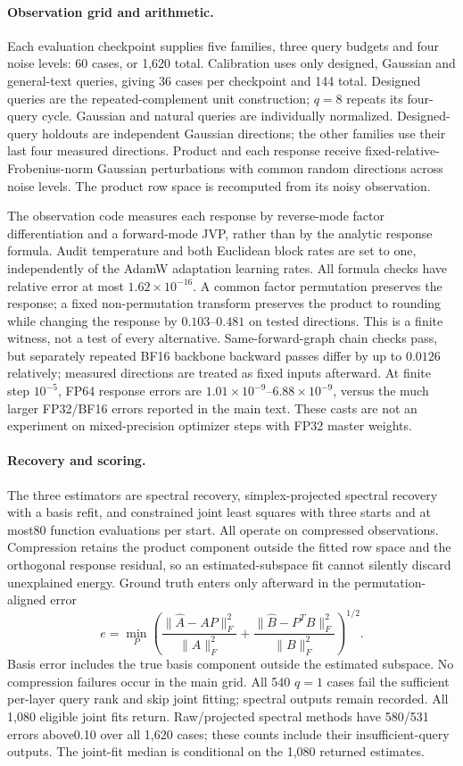 \paragraph{Observation grid and arithmetic.}
Each evaluation checkpoint supplies five families, three query budgets and
 four noise levels: 60 cases, or 1,620 total. Calibration uses only designed,
Gaussian and general-text queries, giving 36 cases per checkpoint and 144
 total. Designed queries are the repeated-complement unit construction;
$q=8$ repeats its four-query cycle. Gaussian and natural queries are
 individually normalized. Designed-query holdouts are independent Gaussian
 directions; the other families use their last four measured directions.
Product and each response receive fixed-relative-Frobenius-norm Gaussian
 perturbations with common random directions across noise levels.
The product row space is recomputed from its noisy observation.

The observation code measures each response by reverse-mode factor
 differentiation and a forward-mode JVP, rather than by the analytic
 response formula. Audit temperature and both Euclidean block rates are
 set to one, independently of the AdamW adaptation learning rates.
All formula checks have relative error at most
$1.62\times10^{-16}$. A common factor permutation preserves the response;
 a fixed non-permutation transform preserves the product to rounding while
 changing the response by $0.103$--$0.481$ on tested directions. This is a
 finite witness, not a test of every alternative. Same-forward-graph chain
 checks pass, but separately repeated BF16 backbone backward passes differ
 by up to $0.0126$ relatively; measured directions are treated as fixed
 inputs afterward. At finite step $10^{-5}$, FP64 response errors are
$1.01\times10^{-9}$--$6.88\times10^{-9}$, versus the much larger FP32/BF16
 errors reported in the main text. These casts are not an experiment on
 mixed-precision optimizer steps with FP32 master weights.

\paragraph{Recovery and scoring.}
The three estimators are spectral recovery, simplex-projected spectral
 recovery with a basis refit, and constrained joint least squares with
 three starts and at most80 function evaluations per start. All operate
 on compressed observations. Compression retains the product component
 outside the fitted row space and the orthogonal response residual, so an
 estimated-subspace fit cannot silently discard unexplained energy.
Ground truth enters only afterward in the permutation-aligned error
\[
 e=\min_P\left(\frac{\|\widehat A-AP\|_F^2}{\|A\|_F^2}
 +\frac{\|\widehat B-P^TB\|_F^2}{\|B\|_F^2}\right)^{1/2}.
\]
Basis error includes the true basis component outside the estimated
 subspace. No compression failures occur in the main grid. All 540
$q=1$ cases fail the sufficient per-layer query rank and skip joint fitting;
 spectral outputs remain recorded. All 1,080 eligible joint fits return.
Raw/projected spectral methods have 580/531 errors above0.10 over all
1,620 cases; these counts include their insufficient-query outputs.
The joint-fit median is conditional on the 1,080 returned estimates.

